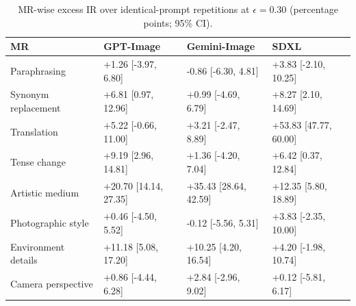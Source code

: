 \begin{table}[t]
\centering
\caption{MR-wise excess IR over identical-prompt repetitions at $\epsilon=0.30$ (percentage points; 95\% CI).}
\label{tab:mr-excess}
\begin{tabular}{llll}
\toprule
MR & GPT-Image & Gemini-Image & SDXL \\
\midrule
Paraphrasing & +1.26 [-3.97, 6.80] & -0.86 [-6.30, 4.81] & +3.83 [-2.10, 10.25] \\
Synonym replacement & +6.81 [0.97, 12.96] & +0.99 [-4.69, 6.79] & +8.27 [2.10, 14.69] \\
Translation & +5.22 [-0.66, 11.00] & +3.21 [-2.47, 8.89] & +53.83 [47.77, 60.00] \\
Tense change & +9.19 [2.96, 14.81] & +1.36 [-4.20, 7.04] & +6.42 [0.37, 12.84] \\
Artistic medium & +20.70 [14.14, 27.35] & +35.43 [28.64, 42.59] & +12.35 [5.80, 18.89] \\
Photographic style & +0.46 [-4.50, 5.52] & -0.12 [-5.56, 5.31] & +3.83 [-2.35, 10.00] \\
Environment details & +11.18 [5.08, 17.20] & +10.25 [4.20, 16.54] & +4.20 [-1.98, 10.74] \\
Camera perspective & +0.86 [-4.44, 6.28] & +2.84 [-2.96, 9.02] & +0.12 [-5.81, 6.17] \\
\bottomrule
\end{tabular}
\end{table}
